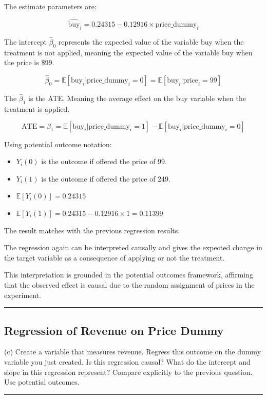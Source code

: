 \documentclass{article}
\newenvironment{colorparagraph}[1]{\par\color{#1}}{\par}
\begin{document}
The estimate parameters are:

$$
\hat{\text{buy}}_i = 0.24315 - 0.12916 \times \text{price\_dummy}_i
$$

The intercept $\hat{\beta}_0$ represents the expected value of the variable buy when the treatment is not applied, meaning the expected value of the variable buy when the price is \$99.

$$
\hat{\beta}_0 = \mathbb{E}[\text{buy}_i | \text{price\_dummy}_i = 0] = \mathbb{E}[\text{buy}_i | \text{price}_i = 99]
$$

The $\hat{\beta}_1$ is the ATE. Meaning the average effect on the buy variable when the treatment is applied.

$$
\text{ATE} = \beta_1 = \mathbb{E}[\text{buy}_i | \text{price\_dummy}_i = 1] - \mathbb{E}[\text{buy}_i | \text{price\_dummy}_i = 0]
$$

Using potential outcome notation:

\begin{itemize}
    \item $Y_i (0)$ is the outcome if offered the price of 99.
    \item $Y_i (1)$ is the outcome if offered the price of 249.
\end{itemize}

\begin{itemize}
    \item $\mathbb{E}[Y_i (0)] = 0.24315$
    \item $\mathbb{E}[Y_i (1)] = 0.24315 - 0.12916 \times 1 = 0.11399$ 
\end{itemize}

The result matches with the previous regression results.

The regression again can be interpreted causally and gives the expected change in the target variable as a consequence of applying or not the treatment.

This interpretation is grounded in the potential outcomes framework, affirming that the observed effect is causal due to the random assignment of prices in the experiment.


\begin{colorparagraph}{questioncolor}
\rule{\textwidth}{0.5pt}

\label{q3c}\subsection{Regression of Revenue on Price Dummy}
(c) Create a variable that measures revenue. Regress this outcome on the dummy variable you just created. Is this regression causal? What do the intercept and slope in this regression represent? Compare explicitly to the previous question. Use potential outcomes.

\rule{\textwidth}{0.5pt}
\end{colorparagraph}
\end{document}
